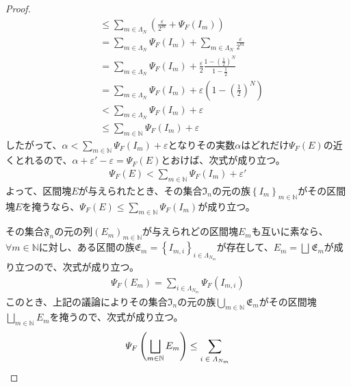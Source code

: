 \documentclass[dvipdfmx]{jsarticle}
\begin{document}
\begin{proof}
\begin{align*}
&\leq \sum_{m \in \varLambda_{N}} \left( \frac{\varepsilon}{2^{m}} + \varPsi_{F}\left( I_{m} \right) \right)\\
&= \sum_{m \in \varLambda_{N}} {\varPsi_{F}\left( I_{m} \right)} + \sum_{m \in \varLambda_{N}} \frac{\varepsilon}{2^{m}}\\
&= \sum_{m \in \varLambda_{N}} {\varPsi_{F}\left( I_{m} \right)} + \frac{\varepsilon}{2}\frac{1 - \left( \frac{1}{2} \right)^{N}}{1 - \frac{1}{2}}\\
&= \sum_{m \in \varLambda_{N}} {\varPsi_{F}\left( I_{m} \right)} + \varepsilon\left( 1 - \left( \frac{1}{2} \right)^{N} \right)\\
&< \sum_{m \in \varLambda_{N}} {\varPsi_{F}\left( I_{m} \right)} + \varepsilon\\
&\leq \sum_{m \in \mathbb{N}} {\varPsi_{F}\left( I_{m} \right)} + \varepsilon
\end{align*}
したがって、$\alpha < \sum_{m \in \mathbb{N}} {\varPsi_{F}\left( I_{m} \right)} + \varepsilon$となりその実数$\alpha$はどれだけ$\varPsi_{F}(E)$の近くとれるので、$\alpha + \varepsilon' - \varepsilon = \varPsi_{F}(E)$とおけば、次式が成り立つ。
\begin{align*}
\varPsi_{F}(E) < \sum_{m \in \mathbb{N}} {\varPsi_{F}\left( I_{m} \right)} + \varepsilon'
\end{align*}
よって、区間塊$E$が与えられたとき、その集合$\mathfrak{I}_{n}$の元の族$\left\{ I_{m} \right\}_{m \in \mathbb{N}}$がその区間塊$E$を掩うなら、$\varPsi_{F}(E) \leq \sum_{m \in \mathbb{N}} {\varPsi_{F}\left( I_{m} \right)}$が成り立つ。\par
その集合$\mathfrak{F}_{n}$の元の列$\left( E_{m} \right)_{m \in \mathbb{N}}$が与えられどの区間塊$E_{m}$も互いに素なら、$\forall m \in \mathbb{N}$に対し、ある区間の族$\mathfrak{E}_{m} = \left\{ I_{m,i} \right\}_{i \in \varLambda_{N_{m}}}$が存在して、$E_{m} = \bigsqcup_{} \mathfrak{E}_{m}$が成り立つので、次式が成り立つ。
\begin{align*}
\varPsi_{F}\left( E_{m} \right) = \sum_{i \in \varLambda_{N_{m}}} {\varPsi_{F}\left( I_{m,i} \right)}
\end{align*}
このとき、上記の議論によりその集合$\mathfrak{I}_{n}$の元の族$\bigcup_{m \in \mathbb{N}} \mathfrak{E}_{m}$がその区間塊$\bigsqcup_{m \in \mathbb{N}} E_{m}$を掩うので、次式が成り立つ。
\begin{align*}
\varPsi_{F}\left( \bigsqcup_{m \in \mathbb{N}} E_{m} \right) \leq \sum_{\scriptsize \begin{matrix}
i \in \varLambda_{N_{m}} \\

\end{matrix}}
\end{align*}
\end{proof}
\end{document}
